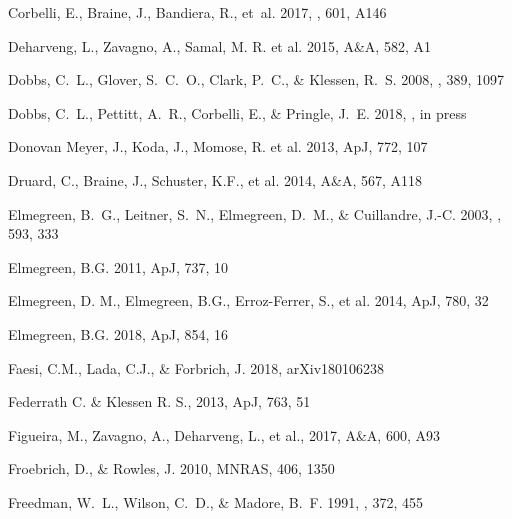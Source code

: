 \documentclass{aa}
\begin{document}
\begin{thebibliography}{}
{Corbelli}, E., {Braine}, J., {Bandiera}, R., {et~al.} 2017, \aap, 601, A146

 Deharveng, L., Zavagno, A., Samal, M.
    R. et al. 2015, A\&A, 582, A1

{Dobbs}, C.~L., {Glover}, S.~C.~O., {Clark}, P.~C., \& {Klessen}, R.~S. 2008,
  \mnras, 389, 1097

{Dobbs}, C.~L., {Pettitt}, A.~R., {Corbelli}, E., \& {Pringle}, J.~E. 2018,
  \mnras, in press

 Donovan Meyer, J., Koda, J., Momose,
    R. et al. 2013, ApJ, 772, 107

 Druard, C., Braine, J., Schuster, K.F., et al.
    2014, A\&A, 567, A118

{Elmegreen}, B.~G., {Leitner}, S.~N., {Elmegreen}, D.~M., \& {Cuillandre},
  J.-C. 2003, \apj, 593, 333

 Elmegreen, B.G. 2011, ApJ, 737, 10

 Elmegreen, D. M., Elmegreen, B.G.,
    Erroz-Ferrer, S., et al. 2014, ApJ, 780, 32

 Elmegreen, B.G. 2018, ApJ, 854, 16

 Faesi, C.M., Lada, C.J., \& Forbrich,
    J. 2018, arXiv180106238

Federrath C. \& Klessen R. S., 2013, ApJ,
    763, 51

 Figueira, M., Zavagno, A., Deharveng, L.,
    et al., 2017, A\&A, 600, A93

 Froebrich, D., \& Rowles, J. 2010,
    MNRAS, 406, 1350

{Freedman}, W.~L., {Wilson}, C.~D., \& {Madore}, B.~F. 1991, \apj, 372, 455


\end{thebibliography}
\end{document}
